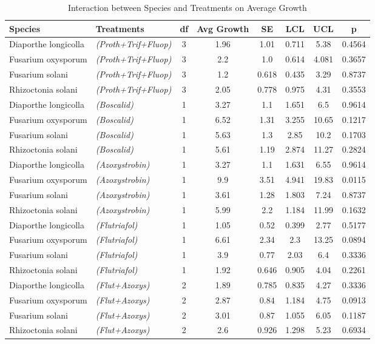 \documentclass[
  10pt,
  letterpaper,
  twocolumn]{article}
\begin{document}
\begin{table}[ht]
\centering
\caption{Interaction between Species and Treatments on Average Growth}
\renewcommand{\arraystretch}{1.2}
\begin{tabular}{|l|l|c|c|c|c|c|c|}
\hline
\rowcolor{gray!15} \textbf{Species} & \textbf{Treatments} & \textbf{df} & \textbf{Avg Growth} & \textbf{SE} & \textbf{LCL} & \textbf{UCL} & \textbf{p} \\
\hline
Diaporthe longicolla & \textit{(Proth+Trif+Fluop)} & 3 & 1.96 & 1.01 & 0.711 & 5.38 & 0.4564 \\
Fusarium oxysporum & \textit{(Proth+Trif+Fluop)} & 3 & 2.2 & 1.0 & 0.614 & 4.081 & 0.3657 \\
Fusarium solani & \textit{(Proth+Trif+Fluop)} & 3 & 1.2 & 0.618 & 0.435 & 3.29 & 0.8737 \\
Rhizoctonia solani & \textit{(Proth+Trif+Fluop)} & 3 & 2.05 & 0.778 & 0.975 & 4.31 & 0.3553 \\
\hline
Diaporthe longicolla & \textit{(Boscalid)} & 1 & 3.27 & 1.1 & 1.651 & 6.5 & 0.9614 \\
Fusarium oxysporum & \textit{(Boscalid)} & 1 & 6.52 & 1.31 & 3.255 & 10.65 & 0.1217 \\
Fusarium solani & \textit{(Boscalid)} & 1 & 5.63 & 1.3 & 2.85 & 10.2 & 0.1703 \\
Rhizoctonia solani & \textit{(Boscalid)} & 1 & 5.61 & 1.19 & 2.874 & 11.27 & 0.2824 \\
\hline
Diaporthe longicolla & \textit{(Azoxystrobin)} & 1 & 3.27 & 1.1 & 1.631 & 6.55 & 0.9614 \\
\rowcolor{yellow!30} Fusarium oxysporum & \textit{(Azoxystrobin)} & 1 & 9.9 & 3.51 & 4.941 & 19.83 & 0.0115 \\
Fusarium solani & \textit{(Azoxystrobin)} & 1 & 3.61 & 1.28 & 1.803 & 7.24 & 0.8737 \\
Rhizoctonia solani & \textit{(Azoxystrobin)} & 1 & 5.99 & 2.2 & 1.184 & 11.99 & 0.1632 \\
\hline
Diaporthe longicolla & \textit{(Flutriafol)} & 1 & 1.05 & 0.52 & 0.399 & 2.77 & 0.5177 \\
Fusarium oxysporum & \textit{(Flutriafol)} & 1 & 6.61 & 2.34 & 2.3 & 13.25 & 0.0894 \\
Fusarium solani & \textit{(Flutriafol)} & 1 & 3.9 & 0.77 & 2.03 & 6.4 & 0.3336 \\
Rhizoctonia solani & \textit{(Flutriafol)} & 1 & 1.92 & 0.646 & 0.905 & 4.04 & 0.2261 \\
\hline
Diaporthe longicolla & \textit{(Flut+Azoxys)} & 2 & 1.89 & 0.785 & 0.835 & 4.27 & 0.3336 \\
Fusarium oxysporum & \textit{(Flut+Azoxys)} & 2 & 2.87 & 0.84 & 1.184 & 4.75 & 0.0913 \\
Fusarium solani & \textit{(Flut+Azoxys)} & 2 & 3.01 & 0.87 & 1.055 & 6.05 & 0.1187 \\
Rhizoctonia solani & \textit{(Flut+Azoxys)} & 2 & 2.6 & 0.926 & 1.298 & 5.23 & 0.6934 \\
\hline
\end{tabular}
\end{table}
\end{document}
